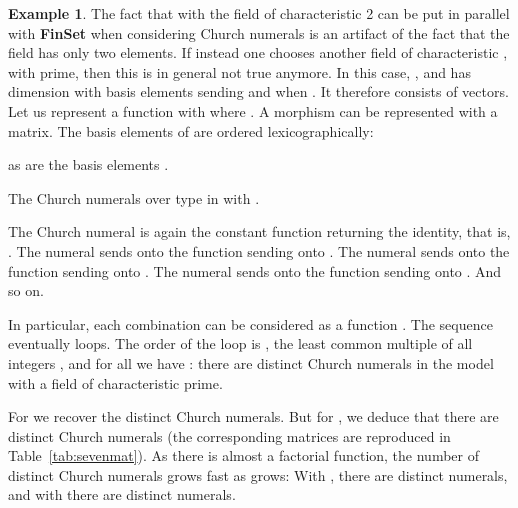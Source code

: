 \documentclass[10pt]{article}
\theoremstyle{plain}
\theoremstyle{definition}
\newtheorem{example}[theorem]{Example}
\newcommand{\FinSet}{\mbox{\bf FinSet}}
\begin{document}
\begin{example}
  \label{ex:numunit-alg2}
  The fact that  with the field of characteristic 2 can
  be put in parallel with {\FinSet} when considering Church numerals
  is an artifact of the fact that the field has only two elements. If
  instead one chooses another field
   of
  characteristic , with  prime,
  then this is in general not true anymore. In this case,
  , and 
  has dimension  with basis elements 
   sending  and  when .
  It therefore consists of  vectors. Let us represent a function
   with  where
  . A morphism
   can be
  represented with a  matrix. The basis elements  of  are ordered
  lexicographically:
  
  as are the basis elements .
\begin{table*}[t]
  \caption{The  Church numerals over type  in  with .}
  \label{tab:sevenmat}
  \scalebox{.84}{\begin{minipage}{5.67in}
  
  
  
  \end{minipage}}
\end{table*}

  The Church numeral  is again the constant function
  returning the identity, that is, .  The numeral
   sends  onto the function sending
   onto . The numeral 
  sends  onto the function sending 
  onto . The numeral  sends
   onto the function sending  onto
  . And so on.
  
  In particular, each combination  can
  be considered as a function . The sequence 
  eventually loops. The order
  of the loop is , the least common multiple of all
  integers , and for all  we have : there are  distinct
  Church numerals in the model
   with a field of characteristic  prime.

  For  we recover the  distinct Church numerals. But for
  , we deduce that there are  distinct Church numerals (the
   corresponding matrices are reproduced in
  Table~\ref{tab:sevenmat}). As there is almost a factorial function, the number of
  distinct Church numerals grows fast as  grows: With , there
  are  distinct numerals, and with  there are  distinct
  numerals.
\end{example}
\end{document}
